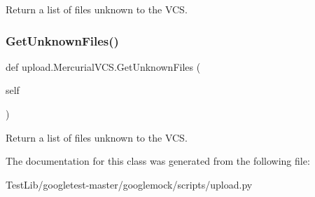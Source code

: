 \begin{DoxyVerb}Return a list of files unknown to the VCS.\end{DoxyVerb}
 \mbox{\label{classupload_1_1MercurialVCS_a6190899fb86cd09ad84cc5d4b0ebd2f3}} 
\subsubsection{\texorpdfstring{Get\+Unknown\+Files()}{GetUnknownFiles()}\hspace{0.1cm}{\footnotesize\ttfamily [2/2]}}
{\footnotesize\ttfamily def upload.\+Mercurial\+V\+C\+S.\+Get\+Unknown\+Files (\begin{DoxyParamCaption}\item[{}]{self }\end{DoxyParamCaption})}

\begin{DoxyVerb}Return a list of files unknown to the VCS.\end{DoxyVerb}
 

The documentation for this class was generated from the following file\+:\begin{DoxyCompactItemize}
\item 
Test\+Lib/googletest-\/master/googlemock/scripts/upload.\+py\end{DoxyCompactItemize}
